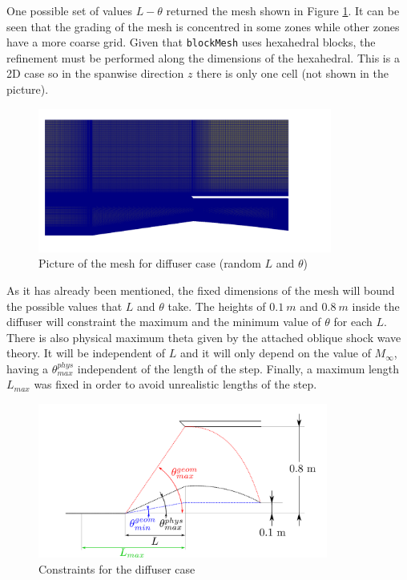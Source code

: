 One possible set of values $L-\theta$ returned the mesh shown in Figure \ref{fig:diffuserMeshPF}. It can be seen that the grading of the mesh is concentred in some zones while other zones have a more coarse grid. Given that \texttt{blockMesh} uses hexahedral blocks, the refinement must be performed along the dimensions of the hexahedral. This is a 2D case so in the spanwise direction $z$ there is only one cell (not shown in the picture).

     \begin{figure}[h!]
        \centering
        \includegraphics[width=0.86\textwidth]{Figures/3/diffuserMeshPF.png}
        \caption{Picture of the mesh for diffuser case (random $L$ and $\theta$)}
        \label{fig:diffuserMeshPF}
    \end{figure}
    
   \newpage
   
   As it has already been mentioned, the fixed dimensions of the mesh will bound the possible values that $L$ and $\theta$ take. The heights of $0.1\ m$ and $0.8\ m$ inside the diffuser will constraint the maximum and the minimum value of $\theta$ for each $L$. There is also physical maximum theta given by the attached oblique shock wave theory. It will be independent of $L$ and it will only depend on the value of $M_\infty$, having a $\theta^{phys}_{max}$ independent of the length of the step. Finally, a maximum length $L_{max}$ was fixed in order to avoid unrealistic lengths of the step.
      
     \begin{figure}[h!]
        \centering
        \includegraphics[width=0.85\textwidth]{Figures/3/diffuserConst4.png}
        \caption{Constraints for the diffuser case}
        \label{fig:diffuserConstr}
    \end{figure}

